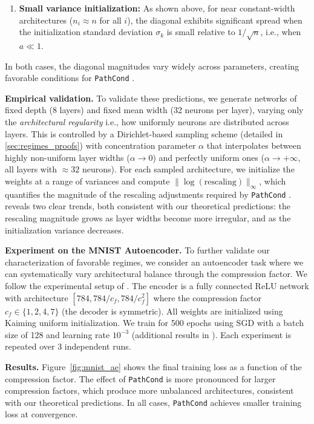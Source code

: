 \documentclass{article}
\theoremstyle{plain}
\theoremstyle{definition}
\theoremstyle{remark}
\def\pathcond{{\texttt{PathCond} }}
\begin{document}
{\begin{enumerate}
\item \textbf{Small variance initialization:} As shown above, for near constant-width architectures ($n_i \approx n$ for all $i$), 
the diagonal exhibits significant spread when the initialization standard deviation $\sigma_k$ is small relative to $1/\sqrt{n}$, i.e., when $a \ll 1$.
\end{enumerate}
In both cases, the diagonal magnitudes vary widely across parameters, creating favorable conditions for \pathcond.

\textbf{Empirical validation.}
To validate these predictions, we generate networks of fixed depth (8 layers) and fixed mean width (32 neurons per layer), 
varying only the \emph{architectural regularity} i.e., how uniformly neurons are distributed across layers. 
This is controlled by a Dirichlet-based sampling scheme (detailed in \cref{sec:regimes_proofs}) 
with concentration parameter $\alpha$ that interpolates between highly non-uniform layer widths ($\alpha \to 0$) 
and perfectly uniform ones ($\alpha \to +\infty$, all layers with $\approx 32$ neurons).
For each sampled architecture, we initialize the weights at a range of variances 
and compute $\|\log(\text{rescaling})\|_\infty$, which quantifies the magnitude of the rescaling adjustments required by \pathcond.
 reveals two clear trends, both consistent with our theoretical predictions: 
the rescaling magnitude grows as layer widths become more irregular, and as the initialization variance decreases.

\textbf{Experiment on the MNIST Autoencoder.}
To further validate our characterization of favorable regimes, we consider an autoencoder task where we can systematically vary architectural balance through the compression factor. 
We follow the experimental setup of \citet{desjardins2015natural}. 
The encoder is a fully connected ReLU network with architecture $[784, 784/c_f, 784/c_f^2]$ where the compression factor $c_f \in \{1, 2, 4, 7\}$ 
(the decoder is symmetric).
All weights are initialized using Kaiming uniform initialization.
We train for 500 epochs using SGD with a batch size of 128 and learning rate $10^{-3}$ (additional results in ). 
Each experiment is repeated over 3 independent runs.

\textbf{Results.}
Figure~\ref{fig:mnist_ae} shows the final training loss as a function of the compression factor. 
The effect of \pathcond is more pronounced for larger compression factors, 
which produce more unbalanced architectures, consistent with our theoretical predictions. In all cases, \pathcond achieves smaller training loss at convergence.


}
\end{document}

